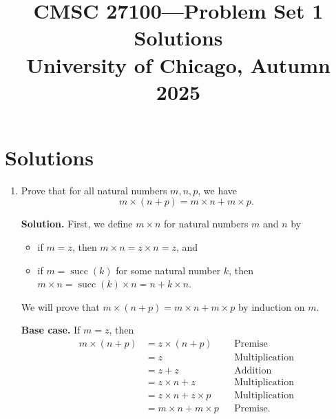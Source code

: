 \documentclass[11pt]{article}
\title{CMSC 27100---Problem Set 1 Solutions\\
\large University of Chicago, Autumn 2025}
\date{}
\newcommand{\succop}{\operatorname{succ}}
\begin{document}
\maketitle

\section*{Solutions}

\begin{enumerate}[leftmargin=*]

\item Prove that for all natural numbers $m,n,p$, we have
\[
  m \times (n+p) = m \times n + m \times p.
\]

\textbf{Solution.} First, we define $m \times n$ for natural numbers $m$ and $n$ by
\begin{itemize}
  \item if $m=z$, then $m \times n = z \times n = z$, and
  \item if $m=\succop(k)$ for some natural number $k$, then
  $m \times n = \succop(k) \times n = n + k \times n$.
\end{itemize}

We will prove that $m \times (n+p)=m\times n+m\times p$ by induction on $m$.

\textbf{Base case.} If $m=z$, then
\begin{align*}
  m \times (n+p) &= z \times (n+p) && \text{Premise} \\
  &= z && \text{Multiplication} \\
  &= z+z && \text{Addition} \\
  &= z\times n + z && \text{Multiplication} \\
  &= z\times n + z\times p && \text{Multiplication} \\
  &= m\times n + m\times p && \text{Premise.}
\end{align*}


\end{enumerate}
\end{document}
